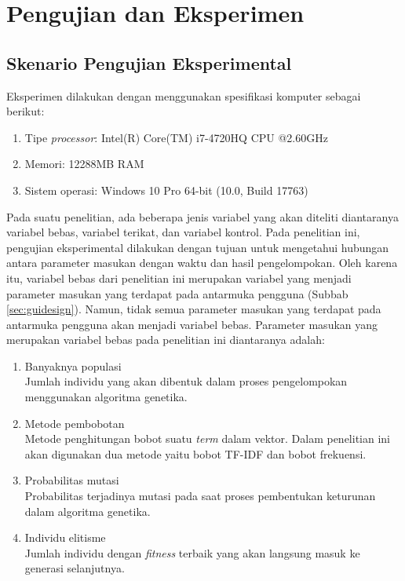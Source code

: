 \chapter{Pengujian dan Eksperimen}
\label{chap:testing}

\section{Skenario Pengujian Eksperimental}
\label{sec:exp-scenario}
Eksperimen dilakukan dengan menggunakan spesifikasi komputer sebagai berikut:

\begin{enumerate}
	\item Tipe \textit{processor}: Intel(R) Core(TM) i7-4720HQ CPU @2.60GHz
	\item Memori: 12288MB RAM
	\item Sistem operasi: Windows 10 Pro 64-bit (10.0, Build 17763)
\end{enumerate}

Pada suatu penelitian, ada beberapa jenis variabel yang akan diteliti diantaranya variabel bebas, variabel terikat, dan variabel kontrol. Pada penelitian ini, pengujian eksperimental dilakukan dengan tujuan untuk mengetahui hubungan antara parameter masukan dengan waktu dan hasil pengelompokan. Oleh karena itu, variabel bebas dari penelitian ini merupakan variabel yang menjadi parameter masukan yang terdapat pada antarmuka pengguna (Subbab \ref{sec:guidesign}). Namun, tidak semua parameter masukan yang terdapat pada antarmuka pengguna akan menjadi variabel bebas. Parameter masukan yang merupakan variabel bebas pada penelitian ini diantaranya adalah:

\begin{enumerate}
	\item Banyaknya populasi \\
	Jumlah individu yang akan dibentuk dalam proses pengelompokan menggunakan algoritma genetika.
	\item Metode pembobotan \\
	Metode penghitungan bobot suatu \textit{term} dalam vektor. Dalam penelitian ini akan digunakan dua metode yaitu bobot TF-IDF dan bobot frekuensi.
	\item Probabilitas mutasi \\
	Probabilitas terjadinya mutasi pada saat proses pembentukan keturunan dalam algoritma genetika.
	\item Individu elitisme \\
	Jumlah individu dengan \textit{fitness} terbaik yang akan langsung masuk ke generasi selanjutnya.
\end{enumerate}

